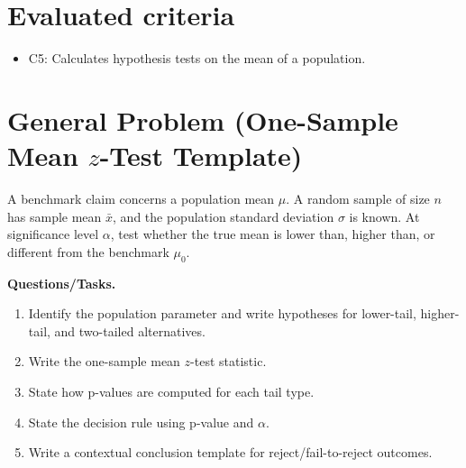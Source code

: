 	\maketitle

	\setcounter{tocdepth}{1}
	\setcounter{secnumdepth}{2}
	\tableofcontents

\section*{Evaluated criteria}
\begin{itemize}
    \item C5: Calculates hypothesis tests on the mean of a population.
\end{itemize}

\section{General Problem (One-Sample Mean \texorpdfstring{\(z\)}{z}-Test Template)}
A benchmark claim concerns a population mean \(\mu\). A random sample of size \(n\) has sample mean \(\bar x\), and the population standard deviation \(\sigma\) is known. At significance level \(\alpha\), test whether the true mean is lower than, higher than, or different from the benchmark \(\mu_0\).

\textbf{Questions/Tasks.}
\begin{enumerate}
    \item[(a)] Identify the population parameter and write hypotheses for lower-tail, higher-tail, and two-tailed alternatives.
    \item[(b)] Write the one-sample mean \(z\)-test statistic.
    \item[(c)] State how p-values are computed for each tail type.
    \item[(d)] State the decision rule using p-value and \(\alpha\).
    \item[(e)] Write a contextual conclusion template for reject/fail-to-reject outcomes.
\end{enumerate}

